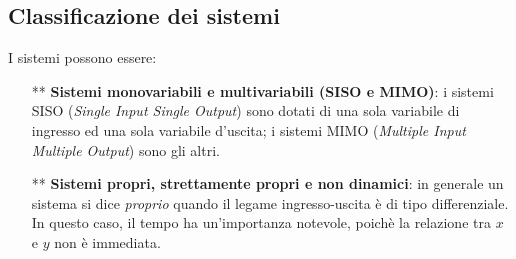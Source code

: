 \documentclass[a4paper]{report}
\begin{document}
\subsection{Classificazione dei sistemi}
I sistemi possono essere: 
\begin{itemize}
\item[**]{\textbf {Sistemi monovariabili e multivariabili (SISO e
    MIMO)}}: i sistemi SISO (\emph{Single Input Single Output}) sono
  dotati di una sola variabile di ingresso ed una sola variabile
  d'uscita; i sistemi MIMO (\emph{Multiple Input Multiple Output})
  sono gli altri.
\item[**]{\textbf{Sistemi propri, strettamente propri e non
    dinamici}}: in generale un sistema si dice \emph{proprio} quando
  il legame ingresso-uscita \`e di tipo differenziale. In questo caso,
  il tempo ha un'importanza notevole, poich\`e la relazione tra $x$ e
  $y$ non \`e immediata.


\end{itemize}
\end{document}
